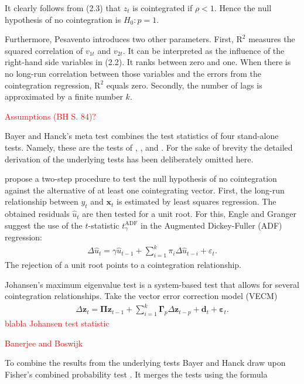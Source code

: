 \documentclass[12pt,a4paper]{article}
\begin{document}
It clearly follows from (2.3) that \(z_t\) is cointegrated if
\(\rho < 1\). Hence the null hypothesis of no cointegration is
\(H_0: p = 1\).

Furthermore, Pesavento introduces two other parameters. First,
\(\text{R}^2\) measures the squared correlation of \(v_{1t}\) and
\(v_{2t}\). It can be interpreted as the influence of the right-hand
side variables in (2.2). It ranks between zero and one. When there is no
long-run correlation between those variables and the errors from the
cointegration regression, \(\text{R}^2\) equals zero. Secondly, the
number of lags is approximated by a finite number \(k\).

\textcolor{red}{Assumptions (BH S. 84)?}

Bayer and Hanck's \autocite*{Bayerhanck_2012} meta test combines the
test statistics of four stand-alone tests. Namely, these are the tests
of \textcite{Englegranger_1987}, \textcite{Johansen_1988},
\textcite{Boswijk_1994} and \textcite{Banerjee_1998}. For the sake of
brevity the detailed derivation of the underlying tests has been
deliberately omitted here.

\textcite{Englegranger_1987} propose a two-step procedure to test the
null hypothesis of no cointegration against the alternative of at least
one cointegrating vector. First, the long-run relationship between
\(y_t\) and \(\mathbf{x}_t\) is estimated by least squares regression.
The obtained residuals \(\hat{u}_t\) are then tested for a unit root.
For this, Engle and Granger suggest the use of the \(t\)-statistic
\(t^{\text{ADF}}_\gamma\) in the Augmented Dickey-Fuller (ADF)
regression: \begin{align}
\Delta \hat{u}_t = \gamma \hat{u}_{t-1} + \sum^{k}_{i=1} \pi_i \Delta \hat{u}_{t-i} + \varepsilon_t.
\end{align} The rejection of a unit root points to a cointegration
relationship.

Johansen's \autocite*{Johansen_1988} maximum eigenvalue test is a
system-based test that allows for several cointegration relationships.
Take the vector error correction model (VECM) \begin{align}
\Delta \mathbf{z}_t = \mathbf{\Pi z}_{t-1} + \sum^{k}_{i = 1} \mathbf{\Gamma}_p \Delta \mathbf{z}_{t-p} + \mathbf{d}_t + \mathbf{\varepsilon}_t.
\end{align} \textcolor{red}{blabla Johansen test statistic}

\textcolor{red}{Banerjee and Boswijk}

To combine the results from the underlying tests Bayer and Hanck draw
upon Fisher's combined probability test \autocite{Fisher_1932}. It
merges the tests using the formula
\end{document}
